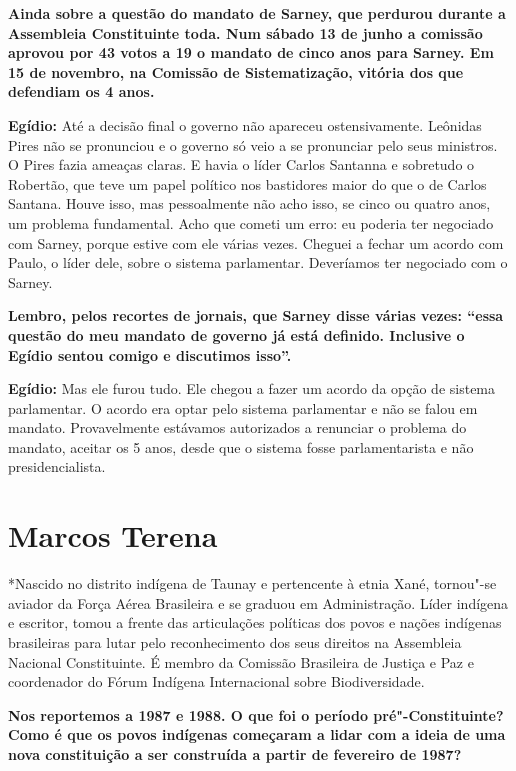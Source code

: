 \textbf{Ainda sobre a questão do mandato de Sarney, que perdurou durante
a Assembleia Constituinte toda. Num sábado 13 de junho a comissão
aprovou por 43 votos a 19 o mandato de cinco anos para Sarney. Em 15 de
novembro, na Comissão de Sistematização, vitória dos que defendiam os 4
anos.}

\textbf{Egídio:} Até a decisão final o governo não apareceu
ostensivamente. Leônidas Pires não se pronunciou e o governo só veio a
se pronunciar pelo seus ministros. O Pires fazia ameaças claras. E havia
o líder Carlos Santanna e sobretudo o Robertão, que teve um papel
político nos bastidores maior do que o de Carlos Santana. Houve isso,
mas pessoalmente não acho isso, se cinco ou quatro anos, um problema
fundamental. Acho que cometi um erro: eu poderia ter negociado com
Sarney, porque estive com ele várias vezes. Cheguei a fechar um acordo
com Paulo, o líder dele, sobre o sistema parlamentar. Deveríamos ter
negociado com o Sarney.

\textbf{Lembro, pelos recortes de jornais, que Sarney disse várias
vezes: ``essa questão do meu mandato de governo já está definido.
Inclusive o Egídio sentou comigo e discutimos isso''.}

\textbf{Egídio:} Mas ele furou tudo. Ele chegou a fazer um acordo da
opção de sistema parlamentar. O acordo era optar pelo sistema
parlamentar e não se falou em mandato. Provavelmente estávamos
autorizados a renunciar o problema do mandato, aceitar os 5 anos, desde
que o sistema fosse parlamentarista e não presidencialista.

\chapter{Marcos Terena}

*Nascido no distrito indígena de Taunay e pertencente à etnia Xané,
tornou"-se aviador da Força Aérea Brasileira e se graduou em
Administração. Líder indígena e escritor, tomou a frente das
articulações políticas dos povos e nações indígenas brasileiras para
lutar pelo reconhecimento dos seus direitos na Assembleia Nacional
Constituinte. É membro da Comissão Brasileira de Justiça e Paz e
coordenador do Fórum Indígena Internacional sobre Biodiversidade.

\textbf{Nos reportemos a 1987 e 1988. O que foi o período
pré"-Constituinte? Como é que os povos indígenas começaram a lidar com a
ideia de uma nova constituição a ser construída a partir de fevereiro de
1987?}

